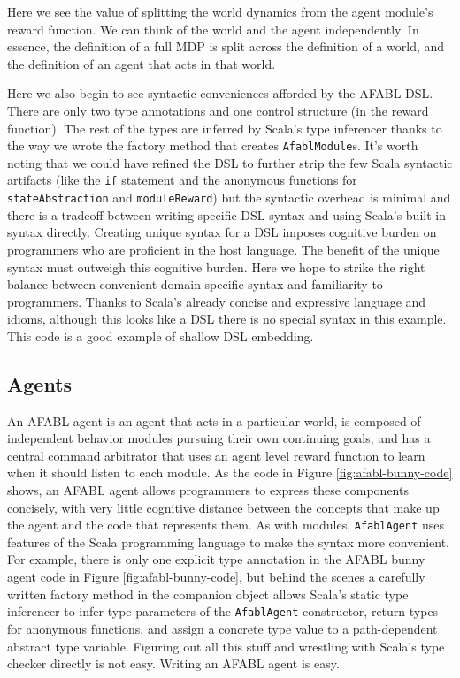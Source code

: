 Here we see the value of splitting the world dynamics from the agent module's reward function. We can think of the world and the agent independently. In essence, the definition of a full MDP is split across the definition of a world, and the definition of an agent that acts in that world.

Here we also begin to see syntactic conveniences afforded by the AFABL DSL. There are only two type annotations and one control structure (in the reward function). The rest of the types are inferred by Scala's type inferencer thanks to the way we wrote the factory method that creates {\tt AfablModule}s. It's worth noting that we could have refined the DSL to further strip the few Scala syntactic artifacts (like the {\tt if} statement and the anonymous functions for {\tt stateAbstraction} and {\tt moduleReward}) but the syntactic overhead is minimal and there is a tradeoff between writing specific DSL syntax and using Scala's built-in syntax directly. Creating unique syntax for a DSL imposes cognitive burden on programmers who are proficient in the host language. The benefit of the unique syntax must outweigh this cognitive burden. Here we hope to strike the right balance between convenient domain-specific syntax and familiarity to programmers. Thanks to Scala's already concise and expressive language and idioms, although this looks like a DSL there is no special syntax in this example. This code is a good example of shallow DSL embedding.

\subsection{Agents}\label{sec:afabl-agents}

An AFABL agent is an agent that acts in a particular world, is composed of independent behavior modules pursuing their own continuing goals, and has a central command arbitrator that uses an agent level reward function to learn when it should listen to each module. As the code in Figure \ref{fig:afabl-bunny-code} shows, an AFABL agent allows programmers to express these components concisely, with very little cognitive distance between the concepts that make up the agent and the code that represents them. As with modules, {\tt AfablAgent} uses features of the Scala programming language to make the syntax more convenient. For example, there is only one explicit type annotation in the AFABL bunny agent code in Figure \ref{fig:afabl-bunny-code}, but behind the scenes a carefully written factory method in the companion object allows Scala's static type inferencer to infer type parameters of the {\tt AfablAgent} constructor, return types for anonymous functions, and assign a concrete type value to a path-dependent abstract type variable. Figuring out all this stuff and wrestling with Scala's type checker directly is not easy. Writing an AFABL agent is easy.

